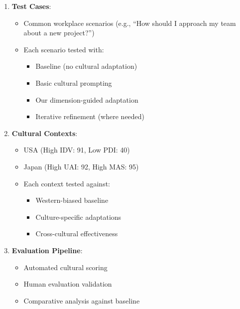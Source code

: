 \documentclass[
]{article}
\providecommand{\tightlist}{%
  \setlength{\itemsep}{0pt}\setlength{\parskip}{0pt}}
\begin{document}
\begin{enumerate}
\def\labelenumi{\arabic{enumi}.}
\tightlist
\item
  \textbf{Test Cases}:

  \begin{itemize}
  \tightlist
  \item
    Common workplace scenarios (e.g., ``How should I approach my team
    about a new project?'')
  \item
    Each scenario tested with:

    \begin{itemize}
    \tightlist
    \item
      Baseline (no cultural adaptation)
    \item
      Basic cultural prompting
    \item
      Our dimension-guided adaptation
    \item
      Iterative refinement (where needed)
    \end{itemize}
  \end{itemize}
\item
  \textbf{Cultural Contexts}:

  \begin{itemize}
  \tightlist
  \item
    USA (High IDV: 91, Low PDI: 40)
  \item
    Japan (High UAI: 92, High MAS: 95)
  \item
    Each context tested against:

    \begin{itemize}
    \tightlist
    \item
      Western-biased baseline
    \item
      Culture-specific adaptations
    \item
      Cross-cultural effectiveness
    \end{itemize}
  \end{itemize}
\item
  \textbf{Evaluation Pipeline}:

  \begin{itemize}
  \tightlist
  \item
    Automated cultural scoring
  \item
    Human evaluation validation
  \item
    Comparative analysis against baseline
  \end{itemize}
\end{enumerate}
\end{document}
